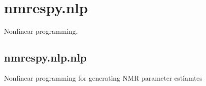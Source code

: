 \documentclass[letterpaper,10pt,english]{sphinxmanual}
\begin{document}
\section{nmrespy.nlp}
\label{\detokenize{references/nlp/index:nmrespy-nlp}}\label{\detokenize{references/nlp/index::doc}}
\sphinxAtStartPar
Nonlinear programming.




\subsection{nmrespy.nlp.nlp}
\label{\detokenize{references/nlp/nlp:module-nmrespy.nlp.nlp}}\label{\detokenize{references/nlp/nlp:nmrespy-nlp-nlp}}\label{\detokenize{references/nlp/nlp::doc}}
\sphinxAtStartPar
Nonlinear programming for generating NMR parameter estiamtes
\end{document}
